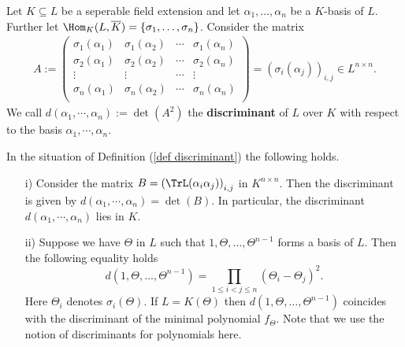 \begin{defi}[Discriminant]\label{def discriminant}
	Let $K\subseteq L$ be a seperable field extension and let $\alpha_1,\dots,\alpha_n$ be a $K$-basis of $L$. Further let $\Hom_K(L,\overline{K})=\{\sigma_1,\dots,\sigma_n\}$. Consider the matrix
	\begin{align*}
		A:=\begin{pmatrix}
		\sigma_1(\alpha_1) & \sigma_1(\alpha_2) &\cdots& \sigma_1(\alpha_n) \\
		\sigma_2(\alpha_1) & \sigma_2(\alpha_2) & \cdots& \sigma_2(\alpha_n) \\
		\vdots &\vdots &\cdots&\vdots\\
		\sigma_n(\alpha_1) & \sigma_n(\alpha_2) &\cdots& \sigma_n(\alpha_n) \\
		\end{pmatrix}
		=\left( \sigma_i(\alpha_j)\right) _{i,j}\in L^{n\times n}.
	\end{align*}
	We call $d(\alpha_1,\cdots,\alpha_n):=\det(A^2)$ the \textbf{discriminant} of $L$ over $K$ with respect to the basis $\alpha_1,\cdots,\alpha_n$.
\end{defi}

\begin{Bem}
	In the situation of Definition (\ref{def discriminant}) the following holds.
	\begin{itemize}
		\item [i)] Consider the matrix $B=\left( \TrL(\alpha_i \alpha_j)\right) _{i,j}$ in $K^{n\times n}$. Then the discriminant is given by $d(\alpha_1,\cdots,\alpha_n)=\det(B)$. In particular, the discriminant $d(\alpha_1,\cdots,\alpha_n)$ lies in $K$.
		\item [ii)] Suppose we have $\Theta$ in $L$ such that $1,\Theta,\dots,\Theta^{n-1}$ forms a basis of $L$. Then the following equality holds $$d(1,\Theta,\dots,\Theta^{n-1})=\prod_{1\le i<j\le n} (\Theta_i-\Theta_j)^2.$$
		Here $\Theta_i$ denotes $\sigma_i(\Theta)$. If $L=K(\Theta)$ then $d(1,\Theta,\dots,\Theta^{n-1})$ coincides with the discriminant of the minimal polynomial $f_\Theta$. Note that we use the notion of discriminants for polynomials here.
	\end{itemize}
\end{Bem}

